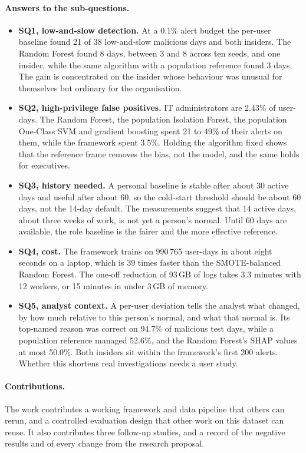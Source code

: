 \documentclass[a4paper,12pt]{article}
\begin{document}
\paragraph{Answers to the sub-questions.}
\begin{itemize}
   \item \textbf{SQ1, low-and-slow detection.} At a 0.1\% alert budget the per-user baseline found 21 of 38 low-and-slow malicious days and both insiders. The Random Forest found 8 days, between 3 and 8 across ten seeds, and one insider, while the same algorithm with a population reference found 3 days. The gain is concentrated on the insider whose behaviour was unusual for themselves but ordinary for the organisation.
   \item \textbf{SQ2, high-privilege false positives.} IT administrators are 2.43\% of user-days. The Random Forest, the population Isolation Forest, the population One-Class SVM and gradient boosting spent 21 to 49\% of their alerts on them, while the framework spent 3.5\%. Holding the algorithm fixed shows that the reference frame removes the bias, not the model, and the same holds for executives.
   \item \textbf{SQ3, history needed.} A personal baseline is stable after about 30 active days and useful after about 60, so the cold-start threshold should be about 60 days, not the 14-day default. The measurements suggest that 14 active days, about three weeks of work, is not yet a person's normal. Until 60 days are available, the role baseline is the fairer and the more effective reference.
   \item \textbf{SQ4, cost.} The framework trains on 990\,765 user-days in about eight seconds on a laptop, which is 39 times faster than the SMOTE-balanced Random Forest. The one-off reduction of 93\,GB of logs takes 3.3 minutes with 12 workers, or 15 minutes in under 3\,GB of memory.
   \item \textbf{SQ5, analyst context.} A per-user deviation tells the analyst what changed, by how much relative to this person's normal, and what that normal is. Its top-named reason was correct on 94.7\% of malicious test days, while a population reference managed 52.6\%, and the Random Forest's SHAP values at most 50.0\%. Both insiders sit within the framework's first 200 alerts. Whether this shortens real investigations needs a user study.
\end{itemize}

\paragraph{Contributions.} The work contributes a working framework and data pipeline that others can rerun, and a controlled evaluation design that other work on this dataset can reuse. It also contributes three follow-up studies, and a record of the negative results and of every change from the research proposal.
\end{document}
